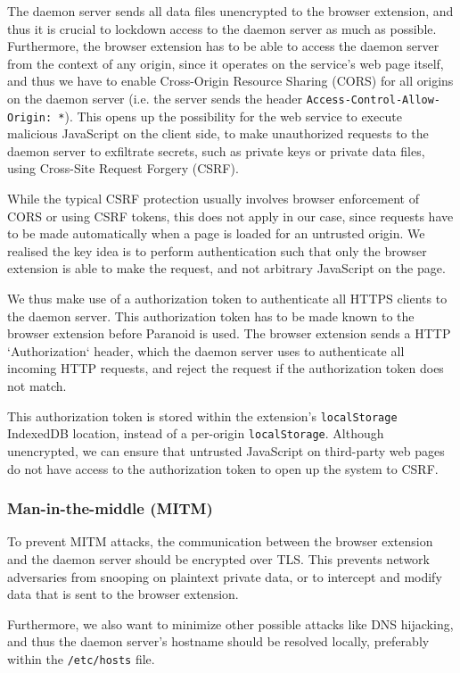 \documentclass[letterpaper,twocolumn,10pt]{article}
\begin{document}
The daemon server sends all data files unencrypted to the browser extension, and thus it is crucial to lockdown access to the daemon server as much as possible. Furthermore, the browser extension has to be able to access the daemon server from the context of any origin, since it operates on the service's web page itself, and thus we have to enable Cross-Origin Resource Sharing (CORS) for all origins on the daemon server (i.e. the server sends the header \texttt{Access-Control-Allow-Origin: *}). This opens up the possibility for the web service to execute malicious JavaScript on the client side, to make unauthorized requests to the daemon server to exfiltrate secrets, such as private keys or private data files, using Cross-Site Request Forgery (CSRF).

While the typical CSRF protection usually involves browser enforcement of CORS or using CSRF tokens, this does not apply in our case, since requests have to be made automatically when a page is loaded for an untrusted origin. We realised the key idea is to perform authentication such that only the browser extension is able to make the request, and not arbitrary JavaScript on the page.

We thus make use of a authorization token to authenticate all HTTPS clients to the daemon server. This authorization token has to be made known to the browser extension before Paranoid is used. The browser extension sends a HTTP `Authorization` header, which the daemon server uses to authenticate all incoming HTTP requests, and reject the request if the authorization token does not match.

This authorization token is stored within the extension's \texttt{localStorage} IndexedDB location, instead of a per-origin \texttt{localStorage}. Although unencrypted, we can ensure that untrusted JavaScript on third-party web pages do not have access to the authorization token to open up the system to CSRF.

\subsubsection{Man-in-the-middle (MITM)}

To prevent MITM attacks, the communication between the browser extension and the daemon server should be encrypted over TLS. This prevents network adversaries from snooping on plaintext private data, or to intercept and modify data that is sent to the browser extension.

Furthermore, we also want to minimize other possible attacks like DNS hijacking, and thus the daemon server's hostname should be resolved locally, preferably within the \texttt{/etc/hosts} file.
\end{document}
